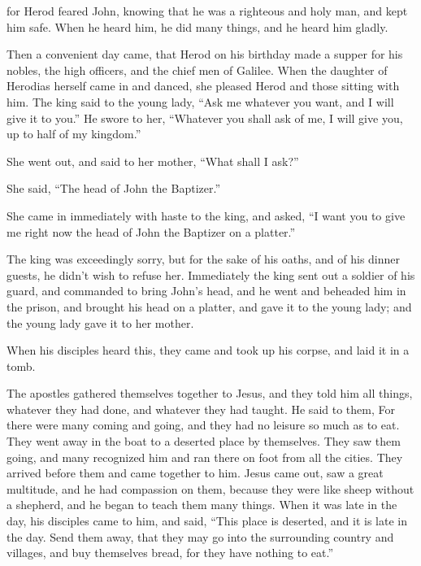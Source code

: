 {for Herod feared John, knowing that he was a righteous and holy man, and kept him safe. When he heard him, he did many things, and he heard him gladly.
\par }{\PP {}Then a convenient day came, that Herod on his birthday made a supper for his nobles, the high officers, and the chief men of Galilee.
When the daughter of Herodias herself came in and danced, she pleased Herod and those sitting with him. The king said to the young lady, “Ask me whatever you want, and I will give it to you.”
He swore to her, “Whatever you shall ask of me, I will give you, up to half of my kingdom.”
\par }{\PP {}She went out, and said to her mother, “What shall I ask?”
\par }{\PP She said, “The head of John the Baptizer.”
\par }{\PP {}She came in immediately with haste to the king, and asked, “I want you to give me right now the head of John the Baptizer on a platter.”
\par }{\PP {}The king was exceedingly sorry, but for the sake of his oaths, and of his dinner guests, he didn’t wish to refuse her.
Immediately the king sent out a soldier of his guard, and commanded to bring John’s head, and he went and beheaded him in the prison,
and brought his head on a platter, and gave it to the young lady; and the young lady gave it to her mother.
\par }{\PP {}When his disciples heard this, they came and took up his corpse, and laid it in a tomb.
\par }{\PP {}The apostles gathered themselves together to Jesus, and they told him all things, whatever they had done, and whatever they had taught.
He said to them,
{} For there were many coming and going, and they had no leisure so much as to eat.
They went away in the boat to a deserted place by themselves.
They saw them going, and many recognized him and ran there on foot from all the cities. They arrived before them and came together to him.
Jesus came out, saw a great multitude, and he had compassion on them, because they were like sheep without a shepherd, and he began to teach them many things.
When it was late in the day, his disciples came to him, and said, “This place is deserted, and it is late in the day.
Send them away, that they may go into the surrounding country and villages, and buy themselves bread, for they have nothing to eat.”
}
